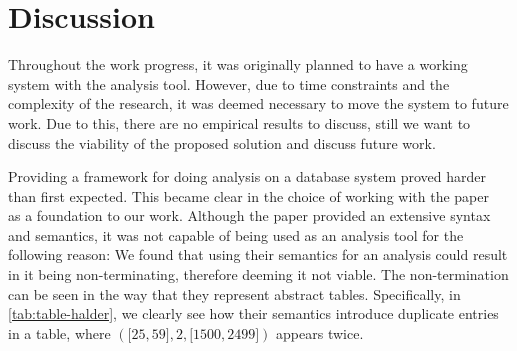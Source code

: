\section{Discussion}\label{sec:discussion}



Throughout the work progress, it was originally planned to have a working system with the analysis tool.
However,
due to time constraints and the complexity of the research,
it was deemed necessary to move the system to future work.
Due to this, there are no empirical results to discuss, still we want to discuss the viability of the proposed solution and discuss future work.


Providing a framework for doing analysis on a database system proved harder than first expected.
This became clear in the choice of working with the paper~\cite{halder_abstract_2012} as a foundation to our work.
Although the paper provided an extensive syntax and semantics, it was not capable of being used as an analysis tool for the following reason:
We found that using their semantics for an analysis could result in it being non-terminating,
therefore deeming it not viable.
The non-termination can be seen in the way that they represent abstract tables.
Specifically, in \autoref{tab:table-halder}, we clearly see how their semantics introduce duplicate entries in a table, where $({[}25,59{]},2,{[}1500,2499{]})$ appears twice.


